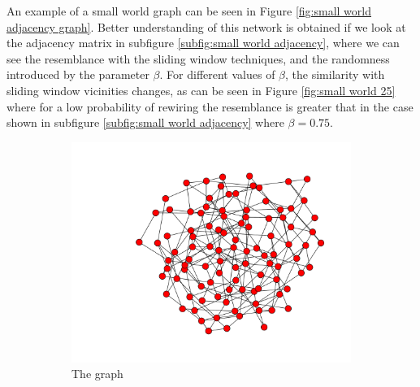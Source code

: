 An example of a small world graph can be seen in Figure \ref{fig:small world adjacency graph}.
Better understanding of this network is obtained if we look at the adjacency matrix in subfigure \ref{subfig:small world adjacency}, where we can see the resemblance with the sliding window techniques, and the randomness introduced by the parameter $\beta$.
For different values of $\beta$, the similarity with sliding window vicinities changes, as can be seen in Figure \ref{fig:small world 25} where for a low probability of rewiring the resemblance is greater that in the case shown in subfigure \ref{subfig:small world adjacency}  where $\beta = 0.75$.

\begin{figure}[h]
        \centering
        \begin{subfigure}[b]{0.5\textwidth}
        	\centering
                \includegraphics[width=\textwidth]{images/topology/small_world_watts_graph.pdf}
                \caption{The graph}
        \end{subfigure}
        \begin{subfigure}[b]{0.4\textwidth}
        	\centering

\end{subfigure}
\end{figure}
